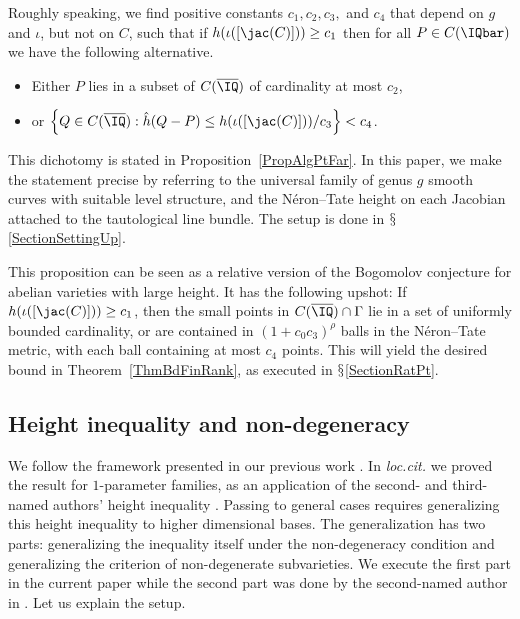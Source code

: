Roughly speaking,
we find positive constants $c_1,c_2,c_3,$ and $c_4$  that depend on
$g$ and $\iota$, but not
on $C$, such that  if $h(\iota([\jac(C)]))\ge
c_1$ then for all $P\in C(\IQbar)$ we have the following  alternative.
\begin{itemize}
\label{eq:alternative}
\item Either $P$ lies in  a subset of $C(\overline \IQ)$ of cardinality at most $c_2$,
\item or $\left\{Q \in C(\overline \IQ) : \hat{h}(Q-P) \le h(\iota([\jac(C)]))/c_3 \right\} < c_4$.
\end{itemize}


This dichotomy is stated in Proposition~\ref{PropAlgPtFar}.
In this paper, we make the statement precise by referring to the universal family of genus $g$ smooth curves with suitable level structure, and the N\'eron--Tate height on each Jacobian attached to the tautological line bundle.
The setup is done in $\mathsection$\ref{SectionSettingUp}.


This proposition can be seen as a relative version of the Bogomolov
conjecture for abelian varieties with large height. It has the
following upshot: If $h(\iota([\jac(C)])) \ge c_1$, then the small
points in $C(\overline \IQ) \cap \Gamma$ lie in a set of uniformly
bounded cardinality, or are contained in $(1+c_0c_3)^\rho$ balls in the
N\'eron--Tate metric, with each ball containing at most $c_4$ points.
This will yield the desired bound in Theorem~\ref{ThmBdFinRank}, as
executed in $\mathsection$\ref{SectionRatPt}.

\subsection{Height inequality and non-degeneracy}\label{subsec:hgtineqnondeg}
We follow the framework presented in our previous work \cite{DGH1p}.
In \textit{loc.cit.} we proved the result for $1$-parameter families,
as an application of the second- and third-named authors' height
inequality \cite[Theorem~1.4]{GaoHab}. Passing to general cases
requires generalizing this height inequality to higher dimensional
bases. The generalization has two parts:  generalizing the inequality
itself under the non-degeneracy condition and generalizing the
criterion of non-degenerate subvarieties.
We execute the first part in the current paper while the second part was
done by the second-named author in \cite{GaoBettiRank}. Let us explain the setup.

